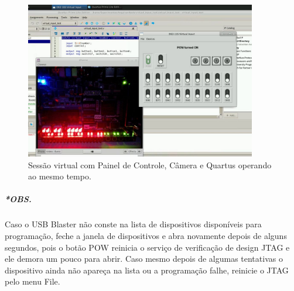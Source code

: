 \documentclass[12pt]{article}
\begin{document}
\begin{enumerate}[font=\bfseries]
    \begin{figure}[H]
    \centering
    \includegraphics[width=0.9\textwidth]{img/operacao.jpg}
    \caption{\label{ref:operacao}Sessão virtual com Painel de Controle, Câmera e Quartus operando ao mesmo tempo.}
    \end{figure}
    
\end{enumerate}

\subparagraph{*OBS.} Caso o USB Blaster não conste na lista de dispositivos disponíveis para programação, feche a janela de dispositivos e abra novamente depois de alguns segundos, pois o botão POW reinicia o serviço de verificação de design JTAG e ele demora um pouco para abrir.
Caso mesmo depois de algumas tentativas o dispositivo ainda não apareça na lista ou a programação falhe, reinicie o JTAG pelo menu File.
\end{document}
